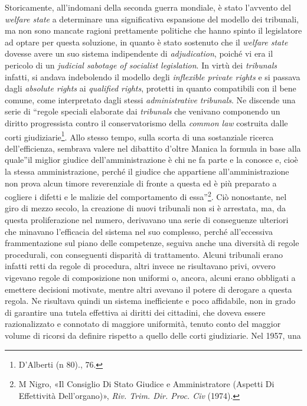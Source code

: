 \documentclass[12pt,it,a4paper,]{report}
\begin{document}
Storicamente, all'indomani della seconda guerra mondiale, è stato
l'avvento del \emph{welfare state} a determinare una significativa
espansione del modello dei tribunali, ma non sono mancate ragioni
prettamente politiche che hanno spinto il legislatore ad optare per
questa soluzione, in quanto è stato sostenuto che il \emph{welfare
state} dovesse avere un suo sistema indipendente di \emph{adjudication},
poiché vi era il pericolo di un \emph{judicial sabotage of socialist
legislation}. In virtù dei \emph{tribunals} infatti, si andava
indebolendo il modello degli \emph{inflexible private rights} e si
passava dagli \emph{absolute rights} ai \emph{qualified rights},
protetti in quanto compatibili con il bene comune, come interpretato
dagli stessi \emph{administrative tribunals}. Ne discende una serie di
``regole speciali elaborate dai \emph{tribunals} che venivano componendo
un diritto progressista contro il conservatorismo della \emph{common
law} costruita dalle corti giudiziarie\footnote{{D'Alberti (n 80).}, 76.}.
Allo stesso tempo, sulla scorta di una sostanziale ricerca
dell'efficienza, sembrava valere nel dibattito d'oltre Manica la formula
in base alla quale''il miglior giudice dell'amministrazione è chi ne fa
parte e la conosce e, cioè la stessa amministrazione, perché il giudice
che appartiene all'amministrazione non prova alcun timore reverenziale
di fronte a questa ed è più preparato a cogliere i difetti e le malizie
del comportamento di essa''\footnote{{M Nigro, {«Il {Consiglio} Di
  {Stato} Giudice e Amministratore (Aspetti Di Effettività
  Dell'organo)»}, \emph{Riv. Trim. Dir. Proc. Civ} (1974).}}. Ciò
nonostante, nel giro di mezzo secolo, la creazione di nuovi tribunali
non si è arrestata, ma, da questa proliferazione nel numero, derivavano
una serie di conseguenze ulteriori che minavano l'efficacia del sistema
nel suo complesso, perché all'eccessiva frammentazione sul piano delle
competenze, seguiva anche una diversità di regole procedurali, con
conseguenti disparità di trattamento. Alcuni tribunali erano infatti
retti da regole di procedura, altri invece ne risultavano privi, ovvero
vigevano regole di composizione non uniformi o, ancora, alcuni erano
obbligati a emettere decisioni motivate, mentre altri avevano il potere
di derogare a questa regola. Ne risultava quindi un sistema inefficiente
e poco affidabile, non in grado di garantire una tutela effettiva ai
diritti dei cittadini, che doveva essere razionalizzato e connotato di
maggiore uniformità, tenuto conto del maggior volume di ricorsi da
definire rispetto a quello delle corti giudiziarie. Nel 1957, una
\end{document}
